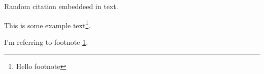 \documentclass{article}
\begin{document}
Random citation \cite{DUMMY:1} embeddeed in text.

This is some example text\footnote{\label{myfootnote}Hello footnote}.

I'm referring to footnote \ref{myfootnote}.

\newpage

 

\end{document}
